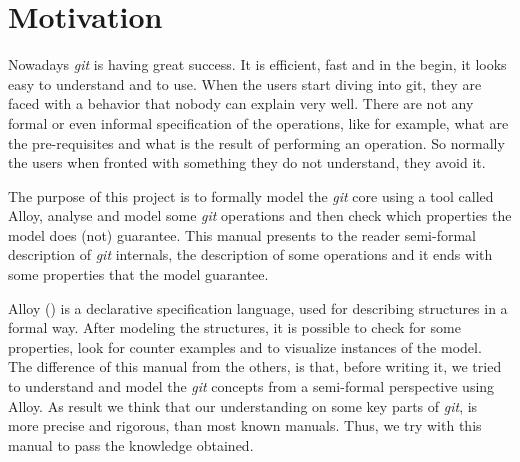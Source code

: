 \section{Motivation}
Nowadays \emph{git} is having great success. It is efficient, fast and
in the begin, it looks easy to understand and to use. When
the users start diving into git, they are faced with a behavior that
nobody can explain very well. There are not any formal or even informal
specification of the operations, like for example, what are the pre-requisites and
what is the result of performing an operation. So normally the users
when fronted with something they do not understand, they avoid it.\par
The purpose of this project is to
formally model the \emph{git} core using a tool called 
Alloy, analyse and model some \emph{git}
operations and then check which properties the model does (not)
guarantee. This manual presents to the reader semi-formal description of
\emph{git} internals, the description of some operations and it ends with
some properties that the model guarantee.\par
Alloy (\cite{Jackson:2006:SAL:1146359}) is a declarative specification language, used for describing structures in 
a formal way. After modeling the structures, it is possible to
check for some properties, look for counter examples and to visualize 
instances of the model. \\

The difference of this manual from the others, is
that, before writing it, we tried to understand and model 
the \emph{git} concepts from a semi-formal perspective using Alloy. As result 
we think that our understanding on some key parts of \emph{git}, is more precise
and rigorous, than most known manuals. Thus, we try with this manual
to pass the knowledge obtained. \par 

